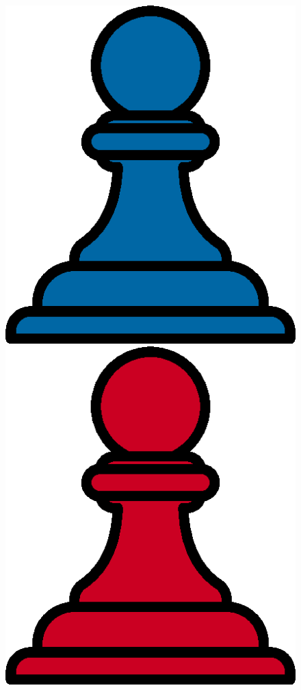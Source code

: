 \documentclass[a6paper, 12pt, parskip=half, DIV=14]{scrartcl}
\begin{document}
\begin{itemize}[leftmargin=4ex, nosep]
\begin{figure}[h]
    \includegraphics[scale=0.3]{Images/pawn_blue.png}
	\qquad
	\includegraphics[scale=0.3]{Images/pawn_red.png}

\end{figure}
\end{itemize}
\end{document}
